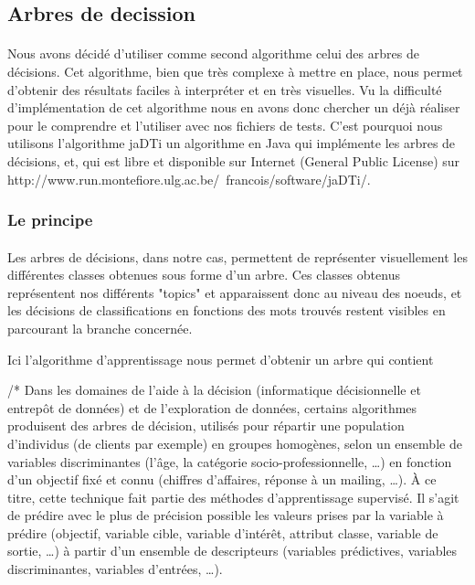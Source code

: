 \subsection{Arbres de decission}

\paragraph{}
Nous avons décidé d'utiliser comme second algorithme celui des arbres de décisions. Cet algorithme, bien que très complexe à mettre en place, nous permet d'obtenir des résultats faciles à interpréter et en très visuelles.
Vu la difficulté d'implémentation de cet algorithme nous en avons donc chercher un déjà réaliser pour le comprendre et l'utiliser avec nos fichiers de tests. C'est pourquoi nous utilisons l'algorithme jaDTi un algorithme en Java qui implémente les arbres de décisions, et, qui est libre et disponible sur Internet (General Public License) sur http://www.run.montefiore.ulg.ac.be/~francois/software/jaDTi/. 


\subsubsection{Le principe} 
\paragraph{}
Les arbres de décisions, dans notre cas, permettent de représenter visuellement les différentes classes obtenues sous forme d'un arbre. Ces classes obtenus représentent nos différents "topics" et apparaissent donc au niveau des noeuds, et les décisions de classifications en fonctions des mots trouvés restent visibles en parcourant la branche concernée.

Ici l'algorithme d'apprentissage nous permet d'obtenir un arbre qui contient 


/* Dans les domaines de l'aide à la décision (informatique décisionnelle et entrepôt de données) et de l'exploration de données, certains algorithmes produisent des arbres de décision, utilisés pour répartir une population d'individus (de clients par exemple) en groupes homogènes, selon un ensemble de variables discriminantes (l'âge, la catégorie socio-professionnelle, …) en fonction d'un objectif fixé et connu (chiffres d'affaires, réponse à un mailing, …). À ce titre, cette technique fait partie des méthodes d’apprentissage supervisé. Il s’agit de prédire avec le plus de précision possible les valeurs prises par la variable à prédire (objectif, variable cible, variable d’intérêt, attribut classe, variable de sortie, …) à partir d’un ensemble de descripteurs (variables prédictives, variables discriminantes, variables d'entrées, …).

